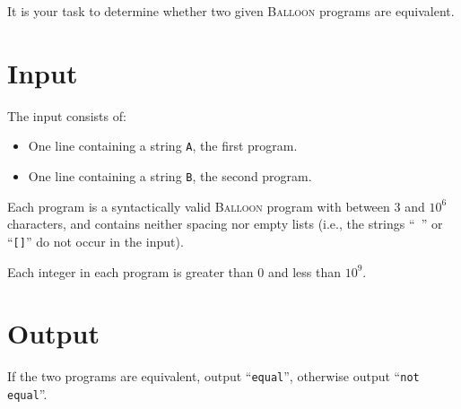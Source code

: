 It is your task to determine whether two given \textsc{Balloon} programs are equivalent.

\section*{Input}
The input consists of:
\begin{itemize}
  \item One line containing a string \texttt{A}, the first program.
  \item One line containing a string \texttt{B}, the second program.
\end{itemize}
Each program is a syntactically valid \textsc{Balloon} program with between $3$ and $10^6$ characters, and contains neither spacing nor empty lists
(i.e., the strings ``\texttt{ }'' or ``\texttt{[]}'' do not occur in the input).

Each integer in each program is greater than $0$ and less than $10^{9}$.

\section*{Output}

If the two programs are equivalent, output ``\texttt{equal}'', otherwise output ``\texttt{not equal}''.
